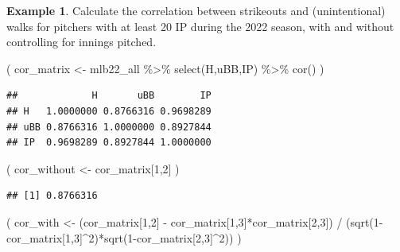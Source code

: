 \documentclass[
  11pt,
]{book}
\newenvironment{Shaded}{\begin{snugshade}}{\end{snugshade}}
\newcommand{\DecValTok}[1]{\textcolor[rgb]{0.00,0.00,0.81}{#1}}
\newcommand{\FunctionTok}[1]{\textcolor[rgb]{0.00,0.00,0.00}{#1}}
\newcommand{\NormalTok}[1]{#1}
\newcommand{\OtherTok}[1]{\textcolor[rgb]{0.56,0.35,0.01}{#1}}
\newcommand{\SpecialCharTok}[1]{\textcolor[rgb]{0.00,0.00,0.00}{#1}}
\theoremstyle{definition}
\theoremstyle{definition}
\newtheorem{example}{Example}[chapter]
\theoremstyle{definition}
\theoremstyle{definition}
\theoremstyle{remark}
\begin{document}
\begin{example}
Calculate the correlation between strikeouts and (unintentional) walks for pitchers with at least 20 IP during the 2022 season, with and without controlling for innings pitched.
\end{example}

\begin{Shaded}
\begin{Highlighting}[]
\NormalTok{( cor\_matrix }\OtherTok{\textless{}{-}}\NormalTok{ mlb22\_all }\SpecialCharTok{\%\textgreater{}\%} \FunctionTok{select}\NormalTok{(H,uBB,IP) }\SpecialCharTok{\%\textgreater{}\%} \FunctionTok{cor}\NormalTok{() )}
\end{Highlighting}
\end{Shaded}

\begin{verbatim}
##             H       uBB        IP
## H   1.0000000 0.8766316 0.9698289
## uBB 0.8766316 1.0000000 0.8927844
## IP  0.9698289 0.8927844 1.0000000
\end{verbatim}

\begin{Shaded}
\begin{Highlighting}[]
\NormalTok{( cor\_without }\OtherTok{\textless{}{-}}\NormalTok{ cor\_matrix[}\DecValTok{1}\NormalTok{,}\DecValTok{2}\NormalTok{] )}
\end{Highlighting}
\end{Shaded}

\begin{verbatim}
## [1] 0.8766316
\end{verbatim}

\begin{Shaded}
\begin{Highlighting}[]
\NormalTok{( cor\_with }\OtherTok{\textless{}{-}}\NormalTok{ (cor\_matrix[}\DecValTok{1}\NormalTok{,}\DecValTok{2}\NormalTok{] }\SpecialCharTok{{-}}\NormalTok{ cor\_matrix[}\DecValTok{1}\NormalTok{,}\DecValTok{3}\NormalTok{]}\SpecialCharTok{*}\NormalTok{cor\_matrix[}\DecValTok{2}\NormalTok{,}\DecValTok{3}\NormalTok{]) }\SpecialCharTok{/}
\NormalTok{    (}\FunctionTok{sqrt}\NormalTok{(}\DecValTok{1}\SpecialCharTok{{-}}\NormalTok{cor\_matrix[}\DecValTok{1}\NormalTok{,}\DecValTok{3}\NormalTok{]}\SpecialCharTok{\^{}}\DecValTok{2}\NormalTok{)}\SpecialCharTok{*}\FunctionTok{sqrt}\NormalTok{(}\DecValTok{1}\SpecialCharTok{{-}}\NormalTok{cor\_matrix[}\DecValTok{2}\NormalTok{,}\DecValTok{3}\NormalTok{]}\SpecialCharTok{\^{}}\DecValTok{2}\NormalTok{)) )}
\end{Highlighting}
\end{Shaded}
\end{document}
